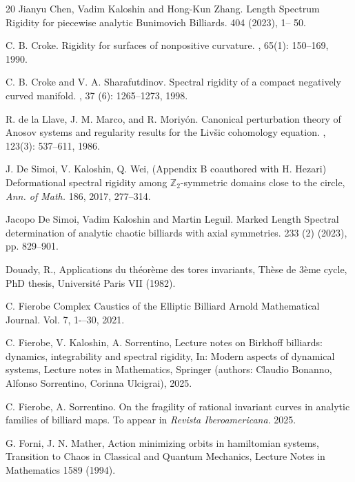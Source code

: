 \documentclass[12pt, openany]{amsart}
\theoremstyle{definition}
\theoremstyle{remark}
\theoremstyle{remark}
\theoremstyle{theorem}
\theoremstyle{theorem}
\theoremstyle{theorem}
\theoremstyle{theorem}
\newcommand{\ZZ}{\mathbb{Z}}
\begin{document}
\begin{thebibliography}{20}
Jianyu Chen, Vadim Kaloshin and Hong-Kun Zhang.
\newblock 
Length Spectrum Rigidity for piecewise analytic Bunimovich Billiards.
 404 (2023), 1-- 50.


C. B. Croke.
\newblock Rigidity for surfaces of nonpositive curvature.
, 65(1): 150--169, 1990.


C. B. Croke and V. A. Sharafutdinov. 
\newblock Spectral rigidity of a compact negatively curved manifold.
, 37 (6): 1265--1273, 1998.

R. de la Llave, J. M. Marco, and R. Moriy\'on. 
\newblock Canonical perturbation theory of Anosov systems and regularity results for the Liv\v{s}ic cohomology equation. 
, 123(3): 537--611, 1986.


J. De Simoi, V. Kaloshin, Q. Wei, (Appendix B coauthored with H. Hezari)
Deformational spectral rigidity among $\ZZ_2$-symmetric domains close to the circle, \textit{Ann. of Math.} 186, 2017, 277–314.


Jacopo De Simoi, Vadim Kaloshin and Martin Leguil.
\newblock Marked Length Spectral determination of analytic chaotic billiards with axial symmetries.
 233 (2) (2023), pp. 829--901.


Douady, R., Applications du théorème des tores invariants, Thèse de 3ème cycle, PhD
thesis, Université Paris VII (1982).

C. Fierobe
\newblock Complex Caustics of the Elliptic Billiard
\newblock Arnold Mathematical Journal.
\newblock Vol. 7, 1-–30, 2021.

C. Fierobe, V. Kaloshin, A. Sorrentino, Lecture notes on Birkhoff billiards: dynamics, integrability and spectral rigidity, In: Modern aspects of dynamical systems, Lecture notes in Mathematics, Springer (authors: Claudio Bonanno, Alfonso Sorrentino, Corinna Ulcigrai), 2025.

C. Fierobe, A. Sorrentino. On the fragility of rational invariant curves in analytic families of billiard maps. To appear in \textit{Revista Iberoamericana}. 2025.

G. Forni, J. N. Mather, Action minimizing orbits in hamiltomian systems, Transition to Chaos in Classical and Quantum Mechanics, Lecture Notes in Mathematics 1589 (1994). 


\end{thebibliography}
\end{document}
